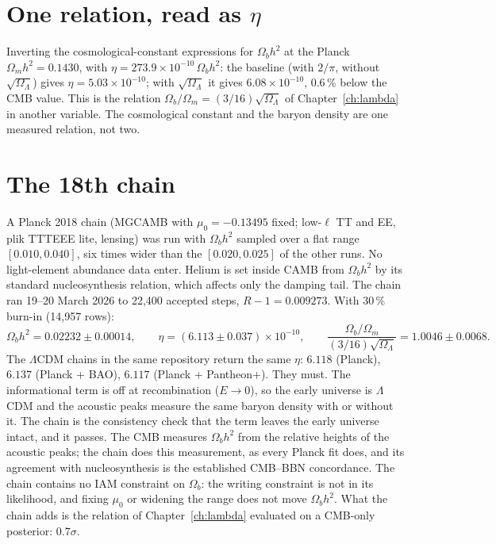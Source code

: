 \section{One relation, read as $\eta$}
Inverting the cosmological-constant expressions for $\Omega_bh^2$ at the Planck $\Omega_mh^2=0.1430$, with $\eta=273.9\times10^{-10}\,\Omega_bh^2$:
the baseline (with $2/\pi$, without $\sqrt{\Omega_\Lambda}$) gives $\eta=5.03\times10^{-10}$; with $\sqrt{\Omega_\Lambda}$ it gives
$6.08\times10^{-10}$, $0.6\,\%$ below the CMB value. This is the relation $\Omega_b/\Omega_m=(3/16)\sqrt{\Omega_\Lambda}$ of
Chapter~\ref{ch:lambda} in another variable. The cosmological constant and the baryon density are one measured relation, not two.

\section{The 18th chain}
A Planck 2018 chain (MGCAMB with $\mu_0=-0.13495$ fixed; low-$\ell$ TT and EE, plik TTTEEE lite, lensing) was run with
$\Omega_bh^2$ sampled over a flat range $[0.010,0.040]$, six times wider than the $[0.020,0.025]$ of the other runs. No light-element abundance
data enter. Helium is set inside CAMB from $\Omega_bh^2$ by its standard nucleosynthesis relation, which affects only the damping tail.
The chain ran 19--20 March 2026 to 22,400 accepted steps, $R-1=0.009273$. With 30\,\% burn-in (14,957 rows):
\begin{equation}\Omega_bh^2=0.02232\pm0.00014,\qquad\eta=(6.113\pm0.037)\times10^{-10},\qquad
\frac{\Omega_b/\Omega_m}{(3/16)\sqrt{\Omega_\Lambda}}=1.0046\pm0.0068 .\end{equation}
The $\Lambda$CDM chains in the same repository return the same $\eta$: $6.118$ (Planck), $6.137$ (Planck + BAO), $6.117$ (Planck + Pantheon+).
They must. The informational term is off at recombination ($E\to0$), so the early universe is $\Lambda$CDM and the acoustic peaks measure the same
baryon density with or without it. The chain is the consistency check that the term leaves the early universe intact, and it passes.
The CMB measures $\Omega_bh^2$ from the relative heights of the acoustic peaks; the chain does this measurement, as every Planck fit does, and its
agreement with nucleosynthesis is the established CMB--BBN concordance. The chain contains no IAM constraint on $\Omega_b$: the writing
constraint is not in its likelihood, and fixing $\mu_0$ or widening the range does not move $\Omega_bh^2$. What the chain adds is the
relation of Chapter~\ref{ch:lambda} evaluated on a CMB-only posterior: $0.7\sigma$.

